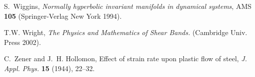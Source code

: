 \documentclass[a4paper,11pt]{article}
\theoremstyle{remark}
\begin{document}
\begin{thebibliography}{10}
%
%

%
%
%



%
%
%
%

%
%
{\sc S.~Wiggins},
{\it Normally hyperbolic invariant manifolds in dynamical  systems}, AMS {\bf 105} (Springer-Verlag New York 1994).

{\sc T.W. Wright},
{\it The Physics and Mathematics of Shear Bands.} (Cambridge Univ. Press 2002).
%


{\sc C.~Zener and J.~H. Hollomon},
Effect of strain rate upon plastic flow of steel,
{\it J. Appl. Phys.}
{\bf 15} (1944), 22--32.


\end{thebibliography}
\end{document}
